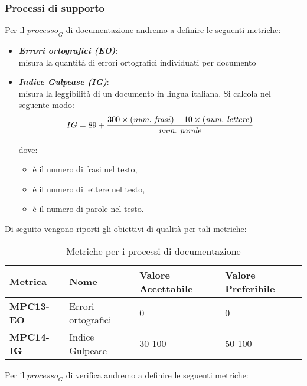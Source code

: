 \subsubsection{Processi di supporto}
Per il $\textit{processo}_G$ di documentazione andremo a definire le seguenti metriche:
\begin{itemize}
    \item \textbf{\emph{Errori ortografici (EO)}}:\\
    misura la quantità di errori ortografici individuati per documento
    \item \textbf{\emph{Indice Gulpease (IG)}}:\\
    misura la leggibilità di un documento in lingua italiana. Si calcola nel seguente modo:
    \[
    IG = 89 + \frac{300 \times (\text{{\emph{num.\ frasi}}}) - 10 \times (\text{\emph{{num.\ lettere}}})}{\text{\emph{{num.\ parole}}}}
    \]

    dove:
    \begin{itemize}
        \item {} \`e il numero di frasi nel testo,
        \item {} \`e il numero di lettere nel testo,
        \item {} \`e il numero di parole nel testo.
    \end{itemize}
    \end{itemize}
Di seguito vengono riporti gli obiettivi di qualità per tali metriche:
\begin{table}[htbp]
    \centering
    \begin{tabular}{|>{\centering\arraybackslash}p{4cm}|p{4cm}|p{4cm}|p{4cm}|}
    \hline
    \rowcolor{gray!30}
    \textbf{Metrica} & \textbf{Nome} & \textbf{Valore Accettabile} & \textbf{Valore Preferibile} \\
    \hline
    \rowcolor{gray!10}
    \textbf{MPC13-EO} & Errori ortografici & 0 & 0 \\
    \hline
    \rowcolor{gray!10}
    \textbf{MPC14-IG} & Indice Gulpease & 30-100 & 50-100 \\
    \hline
    \end{tabular}
    \caption{Metriche per i processi di documentazione}
\end{table}
Per il $\textit{processo}_G$ di verifica andremo a definire le seguenti metriche:
